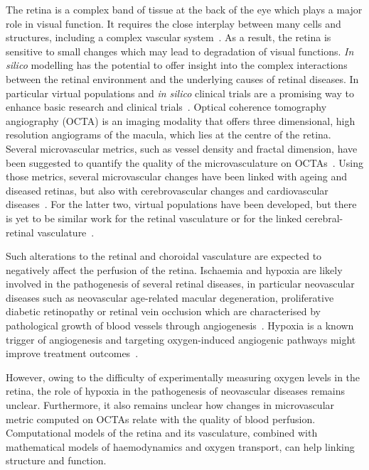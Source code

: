 \documentclass[11pt,]{article}
\begin{document}
The retina is a complex band of tissue at the back of the eye which plays a major role in visual function.
It requires the close interplay between many cells and structures, including a complex vascular system~\cite{Hernandez2023}.
As a result, the retina is sensitive to small changes which may lead to degradation of visual functions.
\textit{In silico} modelling has the potential to offer insight into the complex interactions between the retinal environment and the underlying causes of retinal diseases.
In particular virtual populations and \textit{in silico} clinical trials are a promising way to enhance basic research and clinical trials~\cite{Hernandez2023}.
Optical coherence tomography angiography (OCTA) is an imaging modality
that offers three dimensional, high resolution angiograms of the
macula, which lies at the centre of the retina.
Several microvascular metrics, such as vessel density and fractal dimension, have been suggested to quantify the
quality of the microvasculature on OCTAs~\cite{Chu2016}.
Using those metrics, several microvascular
changes have been linked with ageing and diseased retinas\cite{Ma2021,Trinh_2019, Told2023}, but also with cerebrovascular changes and cardiovascular diseases~\cite{Pleouras_2021,Graff_2021,LopezCuenca_2022}.
For the latter two, virtual populations have been developed, but there is yet to be similar work for the retinal vasculature or for the linked cerebral-retinal vasculature~\cite{Hernandez2023}.

Such alterations to the retinal and choroidal vasculature are expected to negatively affect the perfusion of the retina.
Ischaemia and hypoxia are likely involved in the pathogenesis of several retinal diseases, in
particular neovascular diseases such as neovascular age-related
macular degeneration, proliferative diabetic retinopathy or retinal
vein occlusion which are characterised by pathological growth of blood
vessels through angiogenesis~\cite{Medina_2016}.
Hypoxia is a known trigger of angiogenesis and targeting oxygen-induced angiogenic pathways might improve treatment outcomes~\cite{UsuiOuchi2020}.

However, owing to the difficulty of experimentally measuring oxygen
levels in the retina, the role of hypoxia in the pathogenesis of
neovascular diseases remains unclear. Furthermore, it also remains unclear
how changes in microvascular metric computed on OCTAs relate with the
quality of blood perfusion. Computational models of the retina and its
vasculature, combined with mathematical models of haemodynamics and
oxygen transport, can help linking structure and function.
\end{document}
